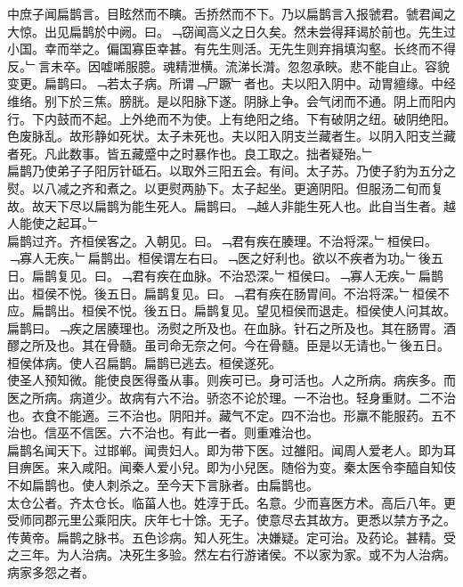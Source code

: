 \documentclass{zhvt-classic}
\begin{document}
\hspace*{2em}中庶子闻扁鹊言。目眩然而不瞚。舌挢然而不下。乃以扁鹊言入报虢君。虢君闻之大惊。出见扁鹊於中阙。曰。﹁窃闻高义之日久矣。然未尝得拜谒於前也。先生过小国。幸而举之。偏国寡臣幸甚。有先生则活。无先生则弃捐填沟壑。长终而不得反。﹂言未卒。因嘘唏服臆。魂精泄横。流涕长潸。忽忽承䀹。悲不能自止。容貌变更。扁鹊曰。﹁若太子病。所谓﹁尸蹶﹂者也。夫以阳入阴中。动胃繵缘。中经维络。别下於三焦。膀胱。是以阳脉下遂。阴脉上争。会气闭而不通。阴上而阳内行。下内鼓而不起。上外绝而不为使。上有绝阳之络。下有破阴之纽。破阴绝阳。色废脉乱。故形静如死状。太子未死也。夫以阳入阴支兰藏者生。以阴入阳支兰藏者死。凡此数事。皆五藏蹙中之时暴作也。良工取之。拙者疑殆。﹂\\
\hspace*{2em}扁鹊乃使弟子子阳厉针砥石。以取外三阳五会。有间。太子苏。乃使子豹为五分之熨。以八减之齐和煮之。以更熨两胁下。太子起坐。更適阴阳。但服汤二旬而复故。故天下尽以扁鹊为能生死人。扁鹊曰。﹁越人非能生死人也。此自当生者。越人能使之起耳。﹂\\
\hspace*{2em}扁鹊过齐。齐桓侯客之。入朝见。曰。﹁君有疾在腠理。不治将深。﹂桓侯曰。﹁寡人无疾。﹂扁鹊出。桓侯谓左右曰。﹁医之好利也。欲以不疾者为功。﹂後五日。扁鹊复见。曰。﹁君有疾在血脉。不治恐深。﹂桓侯曰。﹁寡人无疾。﹂扁鹊出。桓侯不悦。後五日。扁鹊复见。曰。﹁君有疾在肠胃间。不治将深。﹂桓侯不应。扁鹊出。桓侯不悦。後五日。扁鹊复见。望见桓侯而退走。桓侯使人问其故。扁鹊曰。﹁疾之居腠理也。汤熨之所及也。在血脉。针石之所及也。其在肠胃。酒醪之所及也。其在骨髓。虽司命无奈之何。今在骨髓。臣是以无请也。﹂後五日。桓侯体病。使人召扁鹊。扁鹊已逃去。桓侯遂死。\\
\hspace*{2em}使圣人预知微。能使良医得蚤从事。则疾可已。身可活也。人之所病。病疾多。而医之所病。病道少。故病有六不治。骄恣不论於理。一不治也。轻身重财。二不治也。衣食不能適。三不治也。阴阳并。藏气不定。四不治也。形羸不能服药。五不治也。信巫不信医。六不治也。有此一者。则重难治也。\\
\hspace*{2em}扁鹊名闻天下。过邯郸。闻贵妇人。即为带下医。过雒阳。闻周人爱老人。即为耳目痹医。来入咸阳。闻秦人爱小兒。即为小兒医。随俗为变。秦太医令李醯自知伎不如扁鹊也。使人刺杀之。至今天下言脉者。由扁鹊也。\\
\hspace*{2em}太仓公者。齐太仓长。临菑人也。姓淳于氏。名意。少而喜医方术。高后八年。更受师同郡元里公乘阳庆。庆年七十馀。无子。使意尽去其故方。更悉以禁方予之。传黄帝。扁鹊之脉书。五色诊病。知人死生。决嫌疑。定可治。及药论。甚精。受之三年。为人治病。决死生多验。然左右行游诸侯。不以家为家。或不为人治病。病家多怨之者。\\
\end{document}
